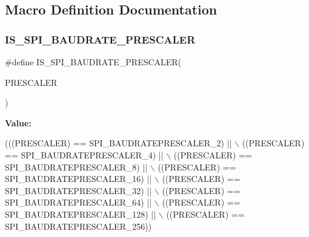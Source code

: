\subsection{Macro Definition Documentation}
\mbox{\label{group___s_p_i___private___macros_gae79f46ed9f91e39dc1f6912cb25fc716}} 
\subsubsection{\texorpdfstring{I\+S\+\_\+\+S\+P\+I\+\_\+\+B\+A\+U\+D\+R\+A\+T\+E\+\_\+\+P\+R\+E\+S\+C\+A\+L\+ER}{IS\_SPI\_BAUDRATE\_PRESCALER}}
{\footnotesize\ttfamily \#define I\+S\+\_\+\+S\+P\+I\+\_\+\+B\+A\+U\+D\+R\+A\+T\+E\+\_\+\+P\+R\+E\+S\+C\+A\+L\+ER(\begin{DoxyParamCaption}\item[{}]{P\+R\+E\+S\+C\+A\+L\+ER }\end{DoxyParamCaption})}

{\bfseries Value\+:}
\begin{DoxyCode}
(((PRESCALER) == SPI\_BAUDRATEPRESCALER\_2)   || \(\backslash\)
                                              ((PRESCALER) == SPI\_BAUDRATEPRESCALER\_4)   || \(\backslash\)
                                              ((PRESCALER) == SPI\_BAUDRATEPRESCALER\_8)   || \(\backslash\)
                                              ((PRESCALER) == SPI\_BAUDRATEPRESCALER\_16)  || \(\backslash\)
                                              ((PRESCALER) == SPI\_BAUDRATEPRESCALER\_32)  || \(\backslash\)
                                              ((PRESCALER) == SPI\_BAUDRATEPRESCALER\_64)  || \(\backslash\)
                                              ((PRESCALER) == SPI\_BAUDRATEPRESCALER\_128) || \(\backslash\)
                                              ((PRESCALER) == SPI\_BAUDRATEPRESCALER\_256))
\end{DoxyCode}
\mbox{\label{group___s_p_i___private___macros_ga6441f08edf79dd5b243c54b888d3cbf7}} 
